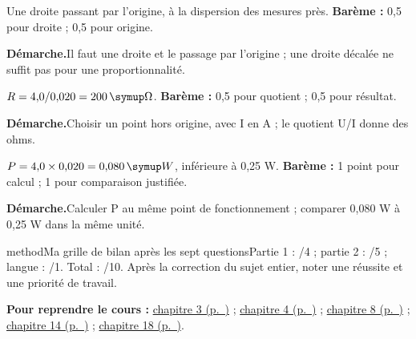 \label{cor-bb-10}
\par\noindent\begin{minipage}{\linewidth}
Une droite passant par l’origine, à la dispersion des mesures près. \textbf{Barème :} 0,5 pour droite ; 0,5 pour origine.\par
\smallskip\noindent\textbf{Démarche.}\enspace Il faut une droite et le passage par l’origine ; une droite décalée ne suffit pas pour une proportionnalité.\par
\end{minipage}\par
\par\noindent\begin{minipage}{\linewidth}
$R=4{,}0/0{,}020=200\unite\Omega$. \textbf{Barème :} 0,5 pour quotient ; 0,5 pour résultat.\par
\smallskip\noindent\textbf{Démarche.}\enspace Choisir un point hors origine, avec I en A ; le quotient U/I donne des ohms.\par
\end{minipage}\par
\par\noindent\begin{minipage}{\linewidth}
$P=4{,}0\times0{,}020=0{,}080\unite W$, inférieure à 0,25 W. \textbf{Barème :} 1 point pour calcul ; 1 pour comparaison justifiée.\par
\smallskip\noindent\textbf{Démarche.}\enspace Calculer P au même point de fonctionnement ; comparer 0,080 W à 0,25 W dans la même unité.\par
{}
\end{minipage}\par
\par\noindent\begin{minipage}{\linewidth}
\begin{pcEncadre}{method}{Ma grille de bilan après les sept questions}Partie 1 : /4 ; partie 2 : /5 ; langue : /1. Total : /10. Après la correction du sujet entier, noter une réussite et une priorité de travail.\end{pcEncadre}
{\small\textbf{Pour reprendre le cours : }\hyperref[chap-3]{chapitre 3 (p.~\pageref*{chap-3})} ; \hyperref[chap-4]{chapitre 4 (p.~\pageref*{chap-4})} ; \hyperref[chap-8]{chapitre 8 (p.~\pageref*{chap-8})} ; \hyperref[chap-14]{chapitre 14 (p.~\pageref*{chap-14})} ; \hyperref[chap-18]{chapitre 18 (p.~\pageref*{chap-18})}.\par}\end{minipage}\par
